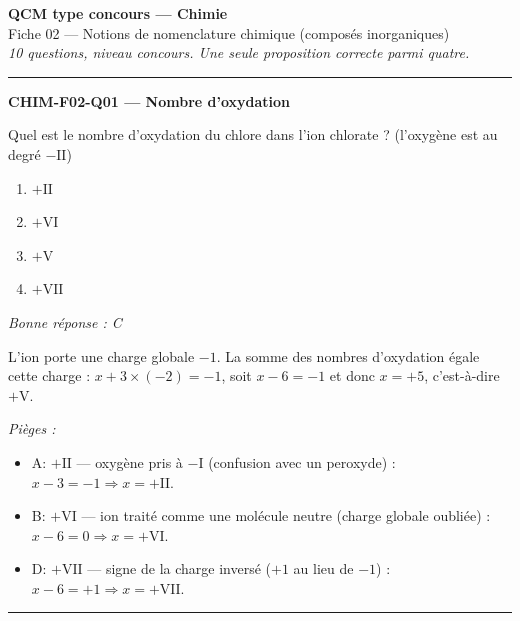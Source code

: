 \documentclass[11pt,a4paper]{article}
\begin{document}
\begin{center}
{\Large\bfseries QCM type concours --- Chimie}\\[2pt]
{\large Fiche 02 --- Notions de nomenclature chimique (composés inorganiques)}\\[2pt]
\textit{10 questions, niveau concours. Une seule proposition correcte parmi quatre.}
\end{center}
\vspace{6pt}\hrule\vspace{10pt}

\noindent\textbf{CHIM-F02-Q01 --- Nombre d'oxydation}\par
Quel est le nombre d'oxydation du chlore dans l'ion chlorate  ? (l'oxygène est au degré $-\mathrm{II}$)
\begin{enumerate}[label=\Alph*)]
\item $+\mathrm{II}$
\item $+\mathrm{VI}$
\item $+\mathrm{V}$
\item $+\mathrm{VII}$
\end{enumerate}
\textit{Bonne réponse : C}\par
L'ion  porte une charge globale $-1$. La somme des nombres d'oxydation égale cette charge : $x + 3\times(-2) = -1$, soit $x - 6 = -1$ et donc $x = +5$, c'est-à-dire $+\mathrm{V}$.\par
\textit{Pièges :}
\begin{itemize}
\item A: $+\mathrm{II}$ --- oxygène pris à $-\mathrm{I}$ (confusion avec un peroxyde) : $x - 3 = -1 \Rightarrow x = +\mathrm{II}$.
\item B: $+\mathrm{VI}$ --- ion traité comme une molécule neutre (charge globale oubliée) : $x - 6 = 0 \Rightarrow x = +\mathrm{VI}$.
\item D: $+\mathrm{VII}$ --- signe de la charge inversé ($+1$ au lieu de $-1$) : $x - 6 = +1 \Rightarrow x = +\mathrm{VII}$.
\end{itemize}
\vspace{8pt}\hrule\vspace{8pt}
\end{document}
